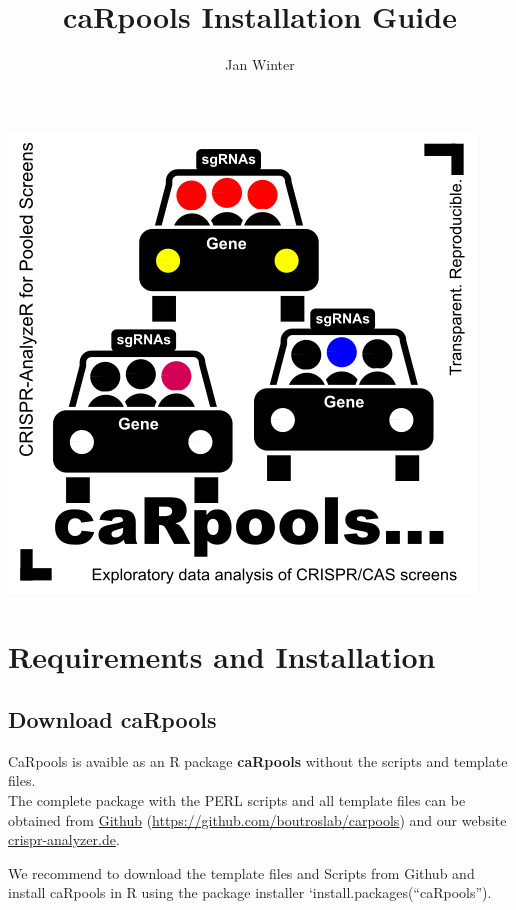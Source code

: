 \documentclass[]{article}
\title{caRpools Installation Guide}
\author{Jan Winter}
\date{}
\begin{document}
\maketitle

{
\hypersetup{linkcolor=black}
\setcounter{tocdepth}{3}
\tableofcontents
}
\newpage

\includegraphics{./pictures/CaRpools.png}

\newpage

\section{Requirements and
Installation}\label{requirements-and-installation}

\subsection{Download caRpools}\label{download-carpools}

CaRpools is avaible as an R package \textbf{caRpools} without the
scripts and template files.\\
The complete package with the PERL scripts and all template files can be
obtained from \href{https://github.com/boutroslab/carpools}{Github}
(\url{https://github.com/boutroslab/carpools}) and our website
\href{http://www.crispr-analyzer.org}{crispr-analyzer.de}.

We recommend to download the template files and Scripts from Github and
install caRpools in R using the package installer
`install.packages(``caRpools'').
\end{document}
